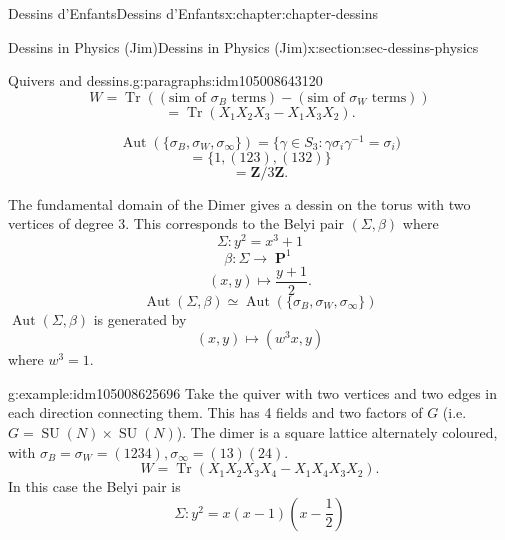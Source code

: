 \documentclass[oneside,10pt,]{book}
\numberwithin{equation}{section}
\newcommand{\inv}{^{-1}}
\newcommand{\ZZ}{\mathbf{Z}}
\DeclareMathOperator{\PP}{\mathbf{P}}
\DeclareMathOperator{\trace}{Tr}
\DeclareMathOperator{\Aut}{Aut}
\DeclareMathOperator{\specialunitary}{SU}
\begin{document}
\begin{chapterptx}{Dessins d'Enfants}{}{Dessins d'Enfants}{}{}{x:chapter:chapter-dessins}
\begin{sectionptx}{Dessins in Physics (Jim)}{}{Dessins in Physics (Jim)}{}{}{x:section:sec-dessins-physics}
\begin{paragraphs}{Quivers and dessins.}{g:paragraphs:idm105008643120}
\begin{equation*}
W = \trace((\text{sim of }\sigma_B\text{ terms}) - (\text{sim of }\sigma_W\text{ terms}))
\end{equation*}
%
\begin{equation*}
= \trace(X_1X_2X_3 - X_1X_3X_2)\text{.}
\end{equation*}
%
\par
%
\begin{equation*}
\Aut( \{\sigma_B,\sigma_W,\sigma_\infty\}) = \{ \gamma\in S_3: \gamma\sigma_i \gamma\inv = \sigma_i)
\end{equation*}
%
\begin{equation*}
= \{1,(123), (132)\}
\end{equation*}
%
\begin{equation*}
= \ZZ/3\ZZ\text{.}
\end{equation*}
%
\par
The fundamental domain of the Dimer gives a dessin on the torus with two vertices of degree 3. This corresponds to the Belyi pair \((\Sigma, \beta)\) where%
\begin{equation*}
\Sigma \colon y^2 = x^3 + 1
\end{equation*}
%
\begin{equation*}
\beta \colon \Sigma  \to \PP^1
\end{equation*}
%
\begin{equation*}
(x,y) \mapsto \frac{y+1}{2}\text{.}
\end{equation*}
%
\begin{equation*}
\Aut(\Sigma, \beta) \simeq \Aut(\{\sigma_B,\sigma_W, \sigma_\infty\})
\end{equation*}
\(\Aut(\Sigma, \beta)\) is generated by%
\begin{equation*}
(x,y) \mapsto (w^3 x,y)
\end{equation*}
where \(w^3 = 1\).%
\begin{example}{}{g:example:idm105008625696}%
Take the quiver with two vertices and two edges in each direction connecting them. This has 4 fields and two factors of \(G\) (i.e. \(G = \specialunitary (N) \times \specialunitary (N)\)). The dimer is a square lattice alternately coloured, with \(\sigma_B = \sigma_W = (1234), \sigma_\infty = (13)(24)\).%
\begin{equation*}
W = \trace (X_1X_2X_3X_4 - X_1 X_4 X_3 X_2)\text{.}
\end{equation*}
In this case the Belyi pair is%
\begin{equation*}
\Sigma \colon y^2= x(x-1)(x-\frac12)

\end{equation*}
\end{example}
\end{paragraphs}
\end{sectionptx}
\end{chapterptx}
\end{document}
